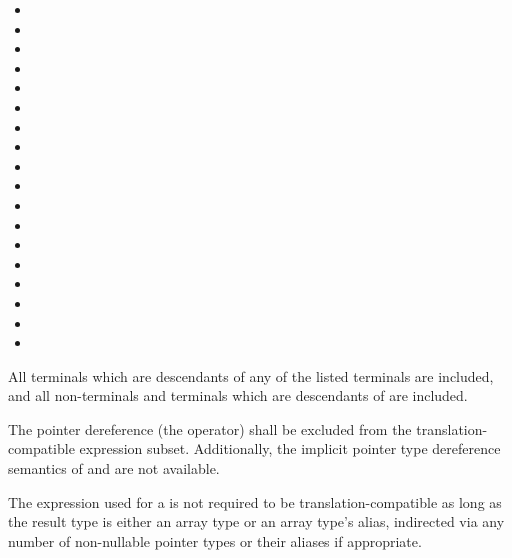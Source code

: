 \begin{minipage}[t][7cm][b]{\textwidth}
\begin{multicols}{2}
\begin{itemize}
\item {}
\item {}
\item {}
\item {}
\item {}
\item {}
\item {}
\item {}
\item {}
\item {}
\item {}
\item {}
\item {}
\item {}
\item {}
\item {}
\item {}
\item {}
\end{itemize}
\end{multicols}
\end{minipage}

\vspace{0.25cm}
\specsubitem
All terminals which are descendants of any of the listed terminals are
included, and all non-terminals and terminals which are descendants of
 are included.

\specsubitem
The pointer dereference  (the \terminal{*}
operator) shall be excluded from the translation-compatible expression subset.
Additionally, the implicit pointer type dereference semantics of
 and  are
not available.

\specsubitem
The expression used for a  is not required to be
translation-compatible as long as the result type is either an array type or an
array type's alias, indirected via any number of non-nullable pointer types or
their aliases if appropriate.

